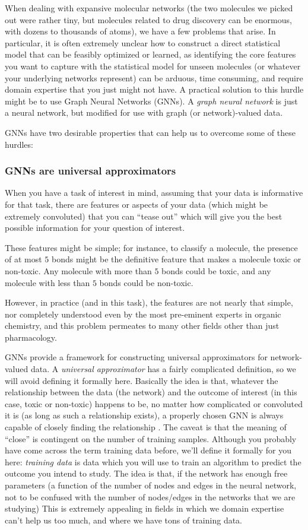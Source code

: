 When dealing with expansive molecular networks (the two molecules we picked out were rather tiny, but molecules related to drug discovery can be enormous, with dozens to thousands of atoms), we have a few problems that arise. In particular, it is often extremely unclear how to construct a direct statistical model that can be feasibly optimized or learned, as identifying the core features you want to capture with the statistical model for unseen molecules (or whatever your underlying networks represent) can be arduous, time consuming, and require domain expertise that you just might not have. A practical solution to this hurdle might be to use Graph Neural Networks (GNNs). A \textit{graph neural network} is just a neural network, but modified for use with graph (or network)-valued data.

GNNs have two desirable properties that can help us to overcome some of these hurdles:
\subsubsection*{GNNs are universal approximators}

When you have a task of interest in mind, assuming that your data is informative for that task, there are features or aspects of your data (which might be extremely convoluted) that you can ``tease out'' which will give you the best possible information for your question of interest. 

These features might be simple; for instance, to classify a molecule, the presence of at most $5$ bonds might be the definitive feature that makes a molecule toxic or non-toxic. Any molecule with more than $5$ bonds could be toxic, and any molecule with less than $5$ bonds could be non-toxic.

However, in practice (and in this task), the features are not nearly that simple, nor completely understood even by the most pre-eminent experts in organic chemistry, and this problem permeates to many other fields other than just pharmacology. 

GNNs provide a framework for constructing universal approximators for network-valued data. A \textit{universal approximator} has a fairly complicated definition, so we will avoid defining it formally here. Basically the idea is that, whatever the relationship between the data (the network) and the outcome of interest (in this case, toxic or non-toxic) happens to be, no matter how complicated or convoluted it is (as long as such a relationship exists), a properly chosen GNN is always capable of closely finding the relationship \cite{Scarselli2008Dec}. The caveat is that the meaning of ``close'' is contingent on the number of training samples. Although you probably have come across the term training data before, we'll define it formally for you here: \textit{training data} is data which you will use to train an algorithm to predict the outcome you intend to study. The idea is that, if the network has enough free parameters (a function of the number of nodes and edges in the neural network, not to be confused with the number of nodes/edges in the networks that we are studying)  This is extremely appealing in fields in which we domain expertise can't help us too much, and where we have tons of training data. 

